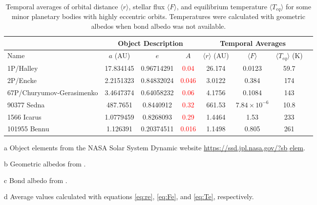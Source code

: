 \documentclass[a4paper,fleqn,usenatbib]{mnras}
\newcommand{\fix}{\textcolor{red}}
\begin{document}
\begin{table}
\begin{threeparttable}
\centering
\caption{Temporal averages of orbital distance $\langle r \rangle$, stellar flux $\langle F \rangle$, and equilibrium temperature $\langle T_{eq} \rangle$ for some minor planetary bodies with highly eccentric orbits. Temperatures were calculated with geometric albedos when bond albedo was not available.}
\begin{tabular}{ l c c c c | c c c }
 \hline
 \hline
 & \multicolumn{3}{c}{Object Description\tnote{a}} & \multicolumn{3}{c}{Temporal Averages\tnote{d}} \\
 \hline
 Name & $a$ (AU) & $e$ & $A$ &
 	$\langle r \rangle$ (AU) & $\langle F \rangle$ & $\langle T_{eq} \rangle$ (K) \\ 
 \hline
 1P/Halley & 17.834145 & 0.96714291 & \fix{0.04}\tnote{b} & 26.174  & 0.0123 & 59.7 \\  
 2P/Encke & 2.2151323 & 0.84832024 & \fix{0.046}\tnote{b} & 3.0122  & 0.384 & 174 \\
 67P/Churyumov-Gerasimenko & 3.4647374 & 0.64058232 & \fix{0.06}\tnote{b} & 4.1756  & 0.1084 & 143 \\
 90377 Sedna & 487.7651 & 0.8440912 & \fix{0.32}\tnote{b}  & 661.53  & $7.84\times10^{-6}$ & 10.8 \\
 1566 Icarus & 1.0779459 & 0.8268093 & \fix{0.29}\tnote{b}  & 1.4464  & 1.53 & 233 \\
 101955	Bennu & 1.126391 & 0.20374511 & \fix{0.016}\tnote{c}   & 1.1498 & 0.805 & 261 \\
 \hline
 \hline
\end{tabular}
\label{tab:elliptic}
	\begin{tablenotes}
	\small
\item[a]{Object elements from the NASA Solar System Dynamic website \href{https://ssd.jpl.nasa.gov/?sb$\_$elem}{https://ssd.jpl.nasa.gov/?sb$\_$elem}.}
\item[b] {Geometric albedos from \citet{2004come.book..223L,2015Sci...347a0628C,2012A&A...541L...6P,2015ApJ...814..117N}.}
\item[c] {Bond albedo from \citet{2015Icar..252..393T}.}
\item[d]{Average values calculated with equations \ref{eq:re}, \ref{eq:Fe}, and \ref{eq:Te}, respectively.}
	\end{tablenotes}
\end{threeparttable}
\end{table}
\end{document}
